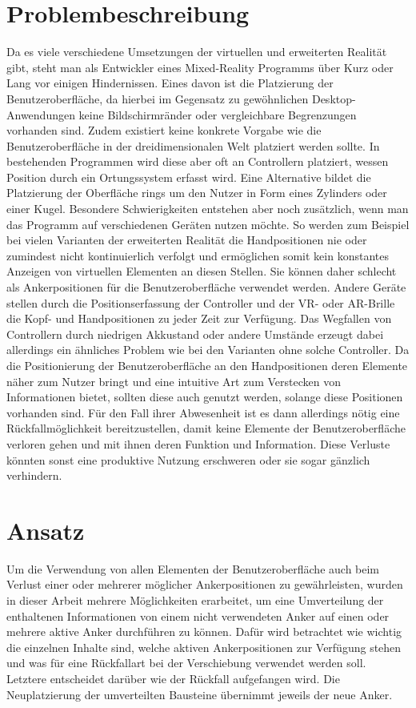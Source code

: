 	\section{Problembeschreibung}
		Da es viele verschiedene Umsetzungen der virtuellen und erweiterten Realität gibt, steht man als Entwickler eines Mixed-Reality Programms über Kurz oder Lang vor einigen Hindernissen. Eines davon ist die Platzierung der Benutzeroberfläche, da hierbei im Gegensatz zu gewöhnlichen Desktop-Anwendungen keine Bildschirmränder oder vergleichbare Begrenzungen vorhanden sind.
		Zudem existiert keine konkrete Vorgabe wie die Benutzeroberfläche in der dreidimensionalen Welt platziert werden sollte. In bestehenden Programmen wird diese aber oft an Controllern platziert, wessen Position durch ein Ortungssystem erfasst wird. Eine Alternative bildet die Platzierung der Oberfläche rings um den Nutzer in Form eines Zylinders oder einer Kugel.
		Besondere Schwierigkeiten entstehen aber noch zusätzlich, wenn man das Programm auf verschiedenen Geräten nutzen möchte. So werden zum Beispiel bei vielen Varianten der erweiterten Realität die Handpositionen nie oder zumindest nicht kontinuierlich verfolgt und ermöglichen somit kein konstantes Anzeigen von virtuellen Elementen an diesen Stellen. Sie können daher schlecht als Ankerpositionen für die Benutzeroberfläche verwendet werden.
		Andere Geräte stellen durch die Positionserfassung der Controller und der VR- oder AR-Brille die Kopf- und Handpositionen zu jeder Zeit zur Verfügung. Das Wegfallen von Controllern durch niedrigen Akkustand oder andere Umstände erzeugt dabei allerdings ein ähnliches Problem wie bei den Varianten ohne solche Controller.
		Da die Positionierung der Benutzeroberfläche an den Handpositionen deren Elemente näher zum Nutzer bringt und eine intuitive Art zum Verstecken von Informationen bietet, sollten diese auch genutzt werden, solange diese Positionen vorhanden sind. Für den Fall ihrer Abwesenheit ist es dann allerdings nötig eine Rückfallmöglichkeit bereitzustellen, damit keine Elemente der Benutzeroberfläche verloren gehen und mit ihnen deren Funktion und Information. Diese Verluste könnten sonst eine produktive Nutzung erschweren oder sie sogar gänzlich verhindern.
		
	\section{Ansatz}
		Um die Verwendung von allen Elementen der Benutzeroberfläche auch beim Verlust einer oder mehrerer möglicher Ankerpositionen zu gewährleisten, wurden in dieser Arbeit mehrere Möglichkeiten erarbeitet, um eine Umverteilung der enthaltenen Informationen von einem nicht verwendeten Anker auf einen oder mehrere aktive Anker durchführen zu können.
		Dafür wird betrachtet wie wichtig die einzelnen Inhalte sind, welche aktiven Ankerpositionen zur Verfügung stehen und was für eine Rückfallart bei der Verschiebung verwendet werden soll. Letztere entscheidet darüber wie der Rückfall aufgefangen wird.
		Die Neuplatzierung der umverteilten Bausteine übernimmt jeweils der neue Anker.
		
